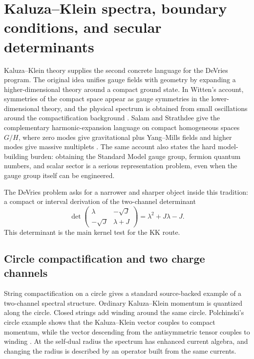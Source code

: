\section{Kaluza--Klein spectra, boundary conditions, and secular determinants}
\label{sec:kk-boundary}

Kaluza--Klein theory supplies the second concrete language for the DeVries program.  The original idea unifies gauge fields with geometry by expanding a higher-dimensional theory around a compact ground state.  In Witten's account, symmetries of the compact space appear as gauge symmetries in the lower-dimensional theory, and the physical spectrum is obtained from small oscillations around the compactification background \cite{WittenKK1981}.  Salam and Strathdee give the complementary harmonic-expansion language on compact homogeneous spaces \(G/H\), where zero modes give gravitational plus Yang--Mills fields and higher modes give massive multiplets \cite{SalamStrathdee1982}.  The same account also states the hard model-building burden: obtaining the Standard Model gauge group, fermion quantum numbers, and scalar sector is a serious representation problem, even when the gauge group itself can be engineered.

The DeVries problem asks for a narrower and sharper object inside this tradition: a compact or interval derivation of the two-channel determinant
\begin{equation}
  \det
  \begin{pmatrix}
    \lambda & -\sqrt J\\
    -\sqrt J & \lambda+J
  \end{pmatrix}
  =
  \lambda^2+J\lambda-J.
  \label{eq:boundary-devries-target}
\end{equation}
This determinant is the main kernel test for the KK route.

\subsection{Circle compactification and two charge channels}
\label{sec:kk-circle-channels}

String compactification on a circle gives a standard source-backed example of a two-channel spectral structure.  Ordinary Kaluza--Klein momentum is quantized along the circle.  Closed strings add winding around the same circle.  Polchinski's circle example shows that the Kaluza--Klein vector couples to compact momentum, while the vector descending from the antisymmetric tensor couples to winding \cite{Polchinski1994}.  At the self-dual radius the spectrum has enhanced current algebra, and changing the radius is described by an operator built from the same currents.

